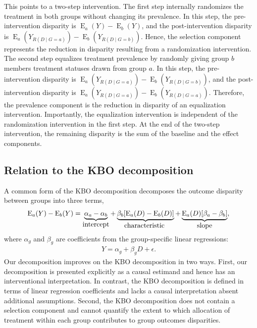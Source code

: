\documentclass[12pt,a4paper]{article}
\newcommand{\E}{\operatorname{E}}
\begin{document}
This points to a two-step intervention. The first step internally randomizes the treatment in both groups without changing its prevalence. In this step, the pre-intervention disparity is $\E_a(Y) - \E_b(Y)$, and the post-intervention disparity is $\E_a \left(Y_{R(D \mid G=a)} \right) - \E_b \left(Y_{R(D \mid G=b)}\right)$. Hence, the selection component represents the reduction in disparity resulting from a randomization intervention. The second step equalizes treatment prevalence by randomly giving group $b$ members treatment statuses drawn from group $a$. In this step, the pre-intervention disparity is $\E_a \left(Y_{R(D \mid G=a)} \right) - \E_b \left(Y_{R(D \mid G=b)}\right)$, and the post-intervention disparity is $\E_a \left(Y_{R(D \mid G=a)} \right)-\E_b \left(Y_{R(D \mid G=a)} \right)$. Therefore, the prevalence component is the reduction in disparity of an equalization intervention. Importantly, the equalization intervention is independent of the randomization intervention in the first step. At the end of the two-step intervention, the remaining disparity is the sum of the baseline and the effect components.

\subsection{Relation to the KBO decomposition}
A common form of the KBO decomposition decomposes the outcome disparity between groups into three terms, 
\begin{align*}
\E_a(Y)-\E_b(Y) = \underbrace{\alpha_a-\alpha_b }_{\text{\normalsize intercept}}
+ \underbrace{\beta_b [\E_a(D)-\E_b(D)]}_{\text{\normalsize characteristic }}
+ \underbrace{\E_a(D)[\beta_a - \beta_b ]}_{\text{\normalsize slope}},
\end{align*}
where $\alpha_g$ and $\beta_g$ are coefficients from the group-specific linear regressions:
\begin{gather*}
Y=\alpha_g+\beta_g D + \epsilon.
\end{gather*}
Our decomposition improves on the KBO decomposition in two ways. First, our decomposition is presented explicitly as a causal estimand and hence has an interventional interpretation. 
In contrast, the KBO decomposition is defined in terms of linear regression coefficients and lacks a causal interpretation absent additional assumptions. Second, the KBO decomposition does not contain a selection component and cannot quantify the extent to which allocation of treatment within each group contributes to group outcomes disparities. 
\end{document}
